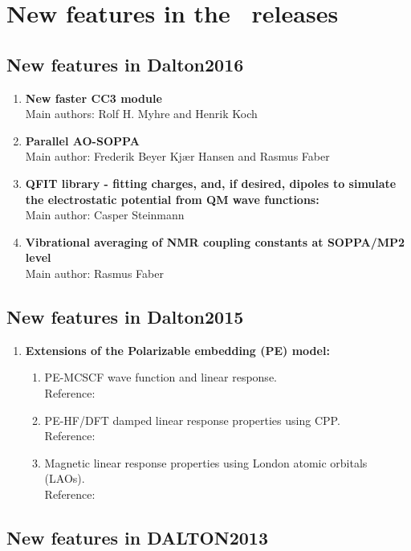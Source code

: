 \chapter{New features in the \dalton\ releases}

\section{New features in Dalton2016}

\begin{enumerate}
\item{\bf New faster CC3 module}\\
Main authors: Rolf H. Myhre and Henrik Koch
\item{\bf Parallel AO-SOPPA}\\
Main author: Frederik Beyer Kjær Hansen and Rasmus Faber
\item{\bf QFIT library - fitting charges, and, if desired, dipoles to simulate the electrostatic potential from QM wave functions:}\\
Main author: Casper Steinmann
\item{\bf Vibrational averaging of NMR coupling constants at SOPPA/MP2 level} \\
Main author: Rasmus Faber
\end{enumerate}

\section{New features in Dalton2015}

\begin{enumerate}
\item{\bf Extensions of the Polarizable embedding (PE) model:}
\begin{enumerate}
 \item{PE-MCSCF wave function and linear response.} \\
  Reference:  \cite{pemcscf}
 \item{PE-HF/DFT damped linear response properties using CPP.} \\
  Reference:  \cite{pecpp}
 \item{Magnetic linear response properties using London atomic orbitals (LAOs).} \\
  Reference:  \cite{pelao}
\end{enumerate}
\end{enumerate}


\section{New features in DALTON2013}

